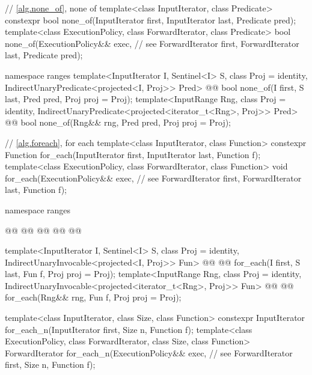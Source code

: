 \begin{codeblock}
  // \ref{alg.none_of}, none of
  template<class InputIterator, class Predicate>
    constexpr bool none_of(InputIterator first, InputIterator last, Predicate pred);
  template<class ExecutionPolicy, class ForwardIterator, class Predicate>
    bool none_of(ExecutionPolicy&& exec, // see 
                 ForwardIterator first, ForwardIterator last, Predicate pred);
\end{codeblock}\begin{addedblock}\begin{codeblock}
  namespace ranges {
    template<InputIterator I, Sentinel<I> S, class Proj = identity,
        IndirectUnaryPredicate<projected<I, Proj>> Pred>
      @@ bool none_of(I first, S last, Pred pred, Proj proj = Proj{});
    template<InputRange Rng, class Proj = identity,
        IndirectUnaryPredicate<projected<iterator_t<Rng>, Proj>> Pred>
      @@ bool none_of(Rng&& rng, Pred pred, Proj proj = Proj{});
  }
\end{codeblock}\end{addedblock}\begin{codeblock}

  // \ref{alg.foreach}, for each
  template<class InputIterator, class Function>
    constexpr Function for_each(InputIterator first, InputIterator last, Function f);
  template<class ExecutionPolicy, class ForwardIterator, class Function>
    void for_each(ExecutionPolicy&& exec, // see 
                  ForwardIterator first, ForwardIterator last, Function f);
\end{codeblock}\begin{addedblock}\begin{codeblock}
  namespace ranges {
    @@
    @@
      @@
      @@
    @\newtxt{\};}@

    template<InputIterator I, Sentinel<I> S, class Proj = identity,
        IndirectUnaryInvocable<projected<I, Proj>> Fun>
      @@
      @@
        for_each(I first, S last, Fun f, Proj proj = Proj{});
    template<InputRange Rng, class Proj = identity,
        IndirectUnaryInvocable<projected<iterator_t<Rng>, Proj>> Fun>
      @@
      @@
        for_each(Rng&& rng, Fun f, Proj proj = Proj{});
  }
\end{codeblock}\end{addedblock}\begin{codeblock}
  template<class InputIterator, class Size, class Function>
    constexpr InputIterator for_each_n(InputIterator first, Size n, Function f);
  template<class ExecutionPolicy, class ForwardIterator, class Size, class Function>
    ForwardIterator for_each_n(ExecutionPolicy&& exec, // see 
                               ForwardIterator first, Size n, Function f);


\end{codeblock}
